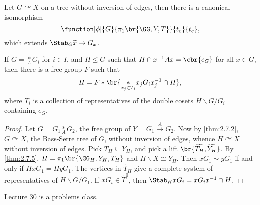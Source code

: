 \begin{theorem}
\label{thm:2.7.5}
Let $ G \curvearrowright X $ on a tree without inversion of edges, then there is a canonical isomorphism
$$ \function[\phi]{G}{\pi_1\br{\GG, Y, T}}{t_e}{t_e}, $$
which extends $ \Stab_G \widetilde{x} \to G_x $.
\end{theorem}

\begin{theorem}
If $ G = \underset{A}{*} G_i $ for $ i \in I $, and $ H \le G $ such that $ H \cap x^{-1}Ax = \cbr{e_G} $ for all $ x \in G $, then there is a free group $ F $ such that
$$ H = F * \br{\underset{x_j \in T_i}{*} x_jG_ix_j^{-1} \cap H}, $$
where $ T_i $ is a collection of representatives of the double cosets $ H \backslash G / G_i $ containing $ e_G $.
\end{theorem}

\begin{proof}
Let $ G = G_1 \underset{A}{*} G_2 $, the free group of $ Y = G_1 \xrightarrow{A} G_2 $. Now by \ref{thm:2.7.2}, $ G \curvearrowright X $, the Bass-Serre tree of $ G $, without inversion of edges, whence $ H \curvearrowright X $ without inversion of edges. Pick $ T_H \subseteq Y_H $, and pick a lift $ \br{\widetilde{T_H}, \widetilde{Y_H}} $. By \ref{thm:2.7.5}, $ H = \pi_1\br{\GG_H, Y_H, T_H} $ and $ H \backslash X \cong Y_H $. Then $ xG_1 \sim yG_1 $ if and only if $ HxG_1 = HyG_1 $. The vertices in $ \widetilde{T_H} $ give a complete system of representatives of $ H \backslash G / G_1 $. If $ xG_i \in \widetilde{T}^0 $, then $ \Stab_H xG_i = xG_ix^{-1} \cap H $.
\end{proof}


Lecture 30 is a problems class.

